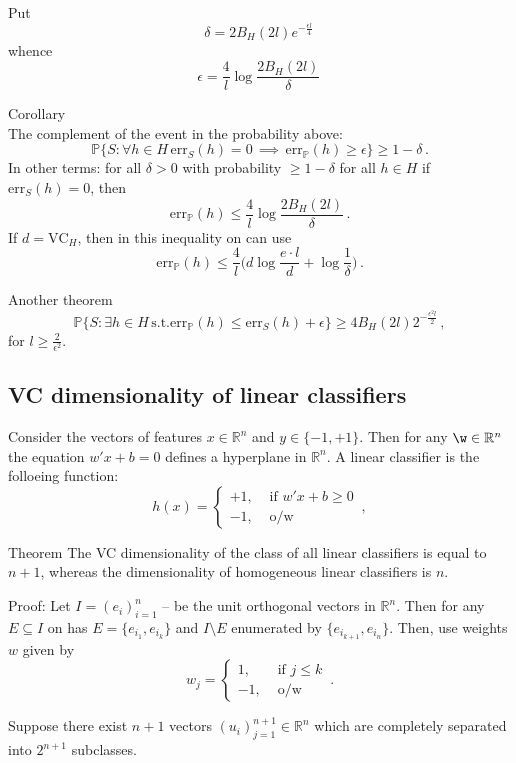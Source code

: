 \documentclass[a4paper]{article}
\newcommand{\Real}{\mathbb{R}}
\newcommand{\err}{\text{err}}
\newcommand{\pr}{\mathbb{P}}
\begin{document}
Put
\[ \delta = 2B_H(2l) e^{-\frac{\epsilon l}{4}} \,\]
whence
\[ \epsilon = \frac{4}{l} \log \frac{2B_H(2l)}{\delta} \,\]

\noindent Corollary\hfill\\
The complement of the event in the probability above:
\[ \pr\{ S : \forall h\in H\, \err_S(h) = 0\,\implies\, \err_\pr(h) \geq \epsilon \} \geq 1-\delta \,. \]
In other terms: for all $\delta>0$ with probability $\geq 1-\delta$
for all $h\in H$ if $\err_S(h) = 0$, then
\[\err_\pr(h)\leq \frac{4}{l}\log \frac{2B_H(2l)}{\delta}\,.\]
If $d = \text{VC}_H$, then in this inequality on can use 
\[\err_\pr(h) \leq \frac{4}{l} \bigl( d\log \frac{e \cdot l}{d} + \log\frac{1}{\delta} \bigr)\,.\]

\noindent Another theorem\hfill\\
\[ \pr\{ S : \exists h\in H\,\text{s.t.} \err_\pr(h) \leq  \err_S(h) + \epsilon \}
	\geq 4 B_H(2l) 2^{-\frac{\epsilon^2 l}{2}} \,, \]
for $l\geq \frac{2}{\epsilon^2}$.

\subsection{VC dimensionality of linear classifiers} %
\label{sub:vc_dimensionality_of_linear_classifiers}

Consider the vectors of features $x\in \Real^n$ and $y\in \{-1,+1\}$.
Then for any $\w\in \Real^n$ the equation $w'x + b = 0$ defines a hyperplane
in $\Real^n$. A linear classifier is the folloeing function:
\[ h(x) = \begin{cases}
	+1, &\text{ if } w'x + b \geq 0\\
	-1, &\text{ o/w }
\end{cases}\,, \]

Theorem
The VC dimensionality of the class of all linear classifiers is equal
to $n+1$, whereas the dimensionality of homogeneous linear classifiers
is $n$.

Proof:
Let $I = (e_i)_{i=1}^n$ -- be the unit orthogonal vectors in $\Real^n$. Then
for any $E\subseteq I$ on has $E = \{ e_{i_1}, e_{i_k}\}$ and $I\setminus E$
enumerated by $\{e_{i_{k+1}}, e_{i_n}\}$. Then, use weights $w$ given by
\[ w_j = \begin{cases}
	1, &\text{ if } j \leq k\\
	-1, &\text{ o/w }
\end{cases}\,.\]

Suppose there exist $n+1$ vectors $(u_i)_{j=1}^{n+1}\in \Real^n$ which
are completely separated into $2^{n+1}$ subclasses.
\end{document}
